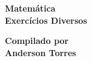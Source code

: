 \begin{titlepage}
  \begin{center}
    \vspace*{1cm}
    
    \textbf{
      Matemática \\
      Exercícios Diversos
    }
    
    \vspace{0.5cm}
    
    \vspace{1.5cm}
    
    \textbf{
      Compilado por \\
      Anderson Torres}
    
    \vfill
    
    \vspace{0.8cm}
  \end{center}
\end{titlepage}

